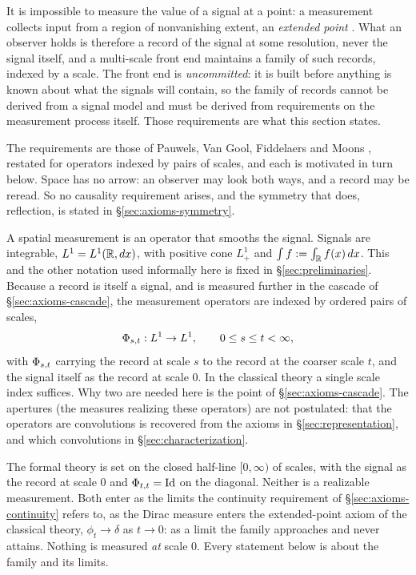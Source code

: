 It is impossible to measure the value of a signal at a point: a measurement collects input
from a region of nonvanishing extent, an \emph{extended point} .
What an observer holds is therefore a record of the signal at some resolution, never the
signal itself, and a multi-scale front end maintains a family of such records, indexed by a
scale. The front end is \emph{uncommitted}: it is built before anything is known about what
the signals will contain, so the family of records cannot be derived from a signal model
and must be derived from requirements on the measurement process itself. Those
requirements are what this section states.

The requirements are those of Pauwels, Van Gool, Fiddelaers and Moons
, restated for operators indexed by pairs of scales, and each
is motivated in turn below. Space has no arrow: an observer may look both ways, and a record
may be reread. So no causality requirement arises, and the symmetry that does, reflection,
is stated in \S\ref{sec:axioms-symmetry}.

A spatial measurement is an operator that smooths the signal. Signals are integrable,
$L^1 = L^1(\mathbb{R}, dx)$, with positive cone $L^1_+$ and $\int f := \int_{\mathbb{R}} f(x)\,dx$. This
and the other notation used informally here is fixed in \S\ref{sec:preliminaries}. Because
a record is itself a signal, and is measured further in the cascade of
\S\ref{sec:axioms-cascade}, the measurement operators are indexed by ordered pairs of
scales,
\[
  \Phi_{s,t} : L^1 \to L^1, \qquad 0 \le s \le t < \infty,
\]
with $\Phi_{s,t}$ carrying the record at scale $s$ to the record at the coarser scale $t$,
and the signal itself as the record at scale $0$. In the classical theory a single scale
index suffices. Why two are needed here is the point of \S\ref{sec:axioms-cascade}. The
apertures (the measures realizing these operators) are not postulated: that the
operators are convolutions is recovered from the axioms in \S\ref{sec:representation}, and
which convolutions in \S\ref{sec:characterization}.

The formal theory is set on the closed half-line $[0,\infty)$ of scales, with the signal as
the record at scale $0$ and $\Phi_{t,t} = \mathrm{Id}$ on the diagonal. Neither is a
realizable measurement. Both enter as the limits the continuity requirement of
\S\ref{sec:axioms-continuity} refers to, as the Dirac measure enters the extended-point
axiom of the classical theory, $\phi_t \to \delta$ as $t \to 0$: as a limit the family
approaches and never attains. Nothing is measured \emph{at} scale $0$. Every statement
below is about the family and its limits.

